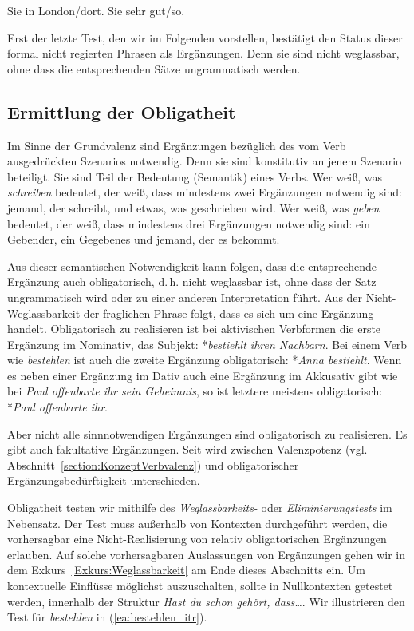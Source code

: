 \ea \label{ea:LOKMODErg}
\ea \label{ea:subklassLOK} Sie \fbox{\phantom{verbt sich}} in London/dort. 
\ex \label{ex:subklassdenMOD} Sie \fbox{\phantom{verbt sich}} sehr gut/so.  
\z 
\z 

Erst der letzte Test, den wir im Folgenden vorstellen, bestätigt den Status dieser formal nicht regierten Phrasen als Ergänzungen. Denn sie sind nicht weglassbar, ohne dass die entsprechenden Sätze ungrammatisch werden.




\subsection{Ermittlung der Obligatheit}\label{subsubsection:TestNOT}

Im Sinne der Grundvalenz sind Ergänzungen bezüglich des vom Verb ausgedrückten Szenarios notwendig. Denn sie sind konstitutiv an jenem Szenario beteiligt. Sie sind Teil der Bedeutung (Semantik) eines Verbs. Wer weiß, was \textit{schreiben} bedeutet, der weiß, dass mindestens zwei Ergänzungen notwendig sind: jemand, der schreibt, und etwas, was geschrieben wird. Wer weiß, was \textit{geben} bedeutet, der weiß, dass mindestens drei Ergänzungen notwendig sind: ein Gebender, ein Gegebenes und jemand, der es bekommt. 

Aus dieser semantischen Notwendigkeit kann folgen, dass die entsprechende Ergänzung auch obligatorisch, d.\,h. nicht weglassbar ist, ohne dass der Satz ungrammatisch wird oder zu einer anderen Interpretation führt. Aus der Nicht-Weglassbarkeit der fraglichen Phrase folgt, dass es sich um eine Ergänzung handelt. Obligatorisch zu realisieren ist \zB bei aktivischen Verbformen die erste Ergänzung im Nominativ, das Subjekt: *\textit{bestiehlt ihren Nachbarn}. Bei einem Verb wie \textit{bestehlen} ist auch die zweite Ergänzung obligatorisch: *\textit{Anna bestiehlt}. Wenn es neben einer Ergänzung im Dativ auch eine Ergänzung im Akkusativ gibt wie bei \textit{Paul offenbarte ihr sein Geheimnis}, so ist letztere meistens obligatorisch: *\textit{Paul offenbarte ihr}. 

Aber nicht alle sinnnotwendigen Ergänzungen sind obligatorisch zu realisieren. Es gibt auch fakultative Ergänzungen. Seit \citet[22]{Pasch1977} wird zwischen Valenzpotenz (vgl. Abschnitt~\ref{section:KonzeptVerbvalenz}) und obligatorischer Ergänzungsbedürftigkeit unterschieden. 

Obligatheit testen wir mithilfe des \textit{Weglassbarkeits-} oder \textit{Eliminierungstests} im Nebensatz. Der Test muss außerhalb von Kontexten durchgeführt werden, die vorhersagbar eine Nicht-Realisierung von relativ obligatorischen Ergänzungen erlauben. Auf solche vorhersagbaren Auslassungen von Ergänzungen gehen wir in dem Exkurs~\ref{Exkurs:Weglassbarkeit} am Ende dieses Abschnitts ein. Um kontextuelle Einflüsse möglichst auszuschalten, sollte in Nullkontexten getestet werden, \zB innerhalb der Struktur \textit{Hast du schon gehört, dass\ldots{}}. Wir illustrieren den Test für \textit{bestehlen} in (\ref{ea:bestehlen_itr}).  

